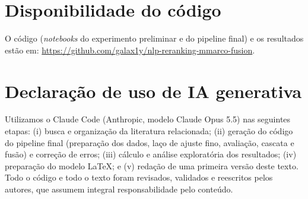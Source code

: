 \documentclass[12pt]{article}
\begin{document}
\section*{Disponibilidade do código}

O código (\textit{notebooks} do experimento preliminar e do pipeline final) e os resultados
estão em: \url{https://github.com/galax1y/nlp-reranking-mmarco-fusion}.

\section*{Declaração de uso de IA generativa}

Utilizamos o Claude Code (Anthropic, modelo Claude Opus 5.5) nas seguintes etapas: (i)
busca e organização da literatura relacionada; (ii) geração do código do pipeline final
(preparação dos dados, laço de ajuste fino, avaliação, cascata e fusão) e correção de erros;
(iii) cálculo e análise exploratória dos resultados; (iv) preparação do modelo \LaTeX{}; e (v)
redação de uma primeira versão deste texto. Todo o código e todo o texto foram revisados,
validados e reescritos pelos autores, que assumem integral responsabilidade pelo conteúdo.



\end{document}
